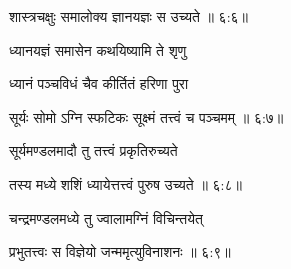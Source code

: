 
{\devanagarifont शास्त्रचक्षुः समालोक्य ज्ञानयज्ञः स उच्यते {॥ ६:६॥} \veg\dontdisplaylinenum }%



{\devanagarifont ध्यानयज्ञं समासेन कथयिष्यामि ते शृणु \thinspace{\dandab} \dontdisplaylinenum }%

{\devanagarifont ध्यानं पञ्चविधं चैव कीर्तितं हरिणा पुरा  \danda\dontdisplaylinenum }%


{\devanagarifont सूर्यः सोमो ऽग्नि स्फटिकः सूक्ष्मं तत्त्वं च पञ्चमम् {॥ ६:७॥} \veg\dontdisplaylinenum }%

{\devanagarifont सूर्यमण्डलमादौ तु तत्त्वं प्रकृतिरुच्यते \thinspace{\dandab} \dontdisplaylinenum }%
 

{\devanagarifont तस्य मध्ये शशिं ध्यायेत्तत्त्वं पुरुष उच्यते {॥ ६:८॥} \veg\dontdisplaylinenum }%

{\devanagarifont चन्द्रमण्डलमध्ये तु ज्वालामग्निं विचिन्तयेत् \thinspace{\dandab} \dontdisplaylinenum }%


{\devanagarifont प्रभुतत्त्वः स विज्ञेयो जन्ममृत्युविनाशनः {॥ ६:९॥} \veg\dontdisplaylinenum }%

